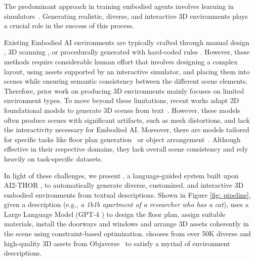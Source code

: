 The predominant approach in training embodied agents involves learning in simulators~\cite{ai2thor, xia2018gibson, puig2018virtualhome, savva2019habitat, phone2proc, Kadian2019Sim2RealPD}. Generating realistic, diverse, and interactive 3D environments plays a crucial role in the success of this process.

Existing Embodied AI environments are typically crafted through manual design \cite{ai2thor, deitke2020robothor,  li2023behavior, gan2020threedworld}, 3D scanning \cite{savva2019habitat, ramakrishnan2021hm3d, phone2proc}, or procedurally generated with hard-coded rules \cite{procthor}. However, these methods require considerable human effort that involves designing a complex layout, using assets supported by an interactive simulator, and placing them into scenes while ensuring semantic consistency between the different scene elements. Therefore, prior work on producing 3D environments mainly focuses on limited environment types.
To move beyond these limitations, recent works adapt 2D foundational models to generate 3D scenes from text~\cite{zhang2023text2nerf,hollein2023text2room,fridman2023scenescape}. However, these models often produce scenes with significant artifacts, such as mesh distortions, and lack the interactivity necessary for Embodied AI.
Moreover, there are models tailored for specific tasks like floor plan generation~\cite{hu2020graph2plan,shabani2023housediffusion} or object arrangement~\cite{wei2023lego,paschalidou2021atiss}. Although effective in their respective domains, they lack overall scene consistency and rely heavily on task-specific datasets.


In light of these challenges, we present \textbf{\holodeck}, a language-guided system built upon AI2-THOR \cite{ai2thor}, to automatically generate diverse, customized, and interactive 3D embodied environments from textual descriptions. Shown in Figure \ref{fig: pipeline}, given a description (e.g., \emph{a 1b1b apartment of a researcher who has a cat}), \holodeck uses a Large Language Model (GPT-4 \cite{openai2023gpt}) to design the floor plan, assign suitable materials, install the doorways and windows and arrange 3D assets coherently in the scene using constraint-based optimization. \holodeck chooses from over 50K diverse and high-quality 3D assets from Objaverse~\cite{deitke2023objaverse} to satisfy a myriad of environment descriptions.
 
